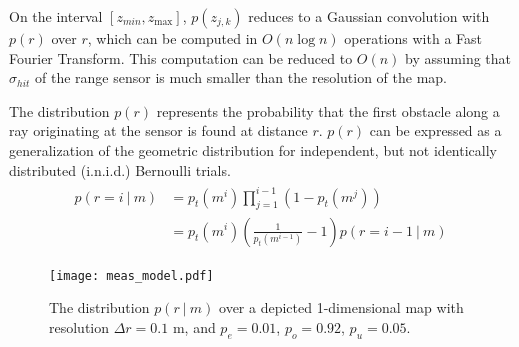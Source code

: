On the interval $\left[z_{min}, z_{\max}\right]$, $p(z_{j, k})$ reduces to a Gaussian convolution with $p(r)$ over $r$, which can be computed in $O(n \log n)$ operations with a Fast Fourier Transform. This computation can be reduced to $O(n)$ by assuming that $\sigma_{hit}$ of the range sensor is much smaller than the resolution of the map.

The distribution $p(r)$ represents the probability that the first obstacle along a ray originating at the sensor is found at distance $r$. $p(r)$ can be expressed as a generalization of the geometric distribution for independent, but not identically distributed (i.n.i.d.) Bernoulli trials.
%
\begin{align}
  \begin{split}
    p(r = i
    \ \vert \
    m)
    &=
    p_{t}(m^i)
    \prod_{j=1}^{i-1}
    \left(
      1 - p_{t}(m^{j})
    \right)
    \\
    &=
    p_{t}(m^i)
    \left(
      \frac{1}{p_{t}(m^{i-1})} - 1
    \right)
    p(r = i - 1
    \ \vert \
    m)
  \end{split}
\end{align}


\begin{figure}
  \centering
  \texttt{[image: meas\_model.pdf]}
  \caption{The distribution $p(r \ \vert \ m)$ over a depicted 1-dimensional map with resolution $\Delta r = 0.1$ m, and $p_{e} = 0.01$, $p_{o} = 0.92$, $p_{u} = 0.05$. \label{fig:measurement_model}}
\end{figure}

